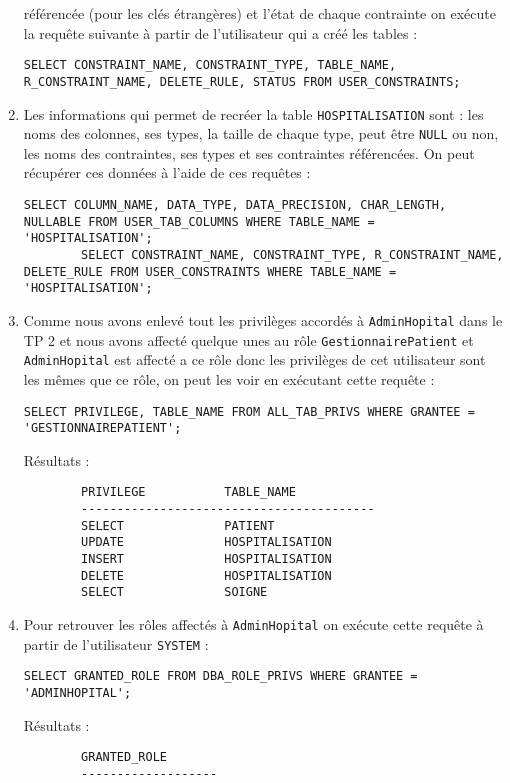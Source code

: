 \documentclass[12pt,a4paper]{article}
\begin{document}
\begin{enumerate}
	référencée (pour les clés étrangères) et l'état de chaque contrainte on exécute la requête suivante à partir de l'utilisateur
	qui a créé les tables :
	\begin{lstlisting}[style=OracleSQL]
		SELECT CONSTRAINT_NAME, CONSTRAINT_TYPE, TABLE_NAME, R_CONSTRAINT_NAME, DELETE_RULE, STATUS FROM USER_CONSTRAINTS;
	\end{lstlisting}
	\item Les informations qui permet de recréer la table \texttt{HOSPITALISATION} sont : les noms des colonnes, ses types, la taille
	de chaque type, peut être \texttt{NULL} ou non, les noms des contraintes, ses types et ses contraintes référencées. On peut
	récupérer ces données à l'aide de ces requêtes :
	\begin{lstlisting}[style=OracleSQL]
		SELECT COLUMN_NAME, DATA_TYPE, DATA_PRECISION, CHAR_LENGTH, NULLABLE FROM USER_TAB_COLUMNS WHERE TABLE_NAME = 'HOSPITALISATION';
		SELECT CONSTRAINT_NAME, CONSTRAINT_TYPE, R_CONSTRAINT_NAME, DELETE_RULE FROM USER_CONSTRAINTS WHERE TABLE_NAME = 'HOSPITALISATION';
	\end{lstlisting}
	\item Comme nous avons enlevé tout les privilèges accordés à \texttt{AdminHopital} dans le TP 2 et nous avons affecté quelque unes
	au rôle \texttt{GestionnairePatient} et \texttt{AdminHopital} est affecté a ce rôle donc les privilèges de cet utilisateur sont
	les mêmes que ce rôle, on peut les voir en exécutant cette requête :
	\begin{lstlisting}[style=OracleSQL]
		SELECT PRIVILEGE, TABLE_NAME FROM ALL_TAB_PRIVS WHERE GRANTEE = 'GESTIONNAIREPATIENT';
	\end{lstlisting}
	Résultats :
	\begin{verbatim}
		PRIVILEGE           TABLE_NAME
		-----------------------------------------
		SELECT              PATIENT
		UPDATE              HOSPITALISATION
		INSERT              HOSPITALISATION
		DELETE              HOSPITALISATION
		SELECT              SOIGNE
	\end{verbatim}
	\item Pour retrouver les rôles affectés à \texttt{AdminHopital} on exécute cette requête à partir de l'utilisateur
	\texttt{SYSTEM} :
	\begin{lstlisting}[style=OracleSQL]
		SELECT GRANTED_ROLE FROM DBA_ROLE_PRIVS WHERE GRANTEE = 'ADMINHOPITAL';
	\end{lstlisting}
	Résultats :
	\begin{verbatim}
		GRANTED_ROLE
		-------------------

\end{verbatim}
\end{enumerate}
\end{document}
